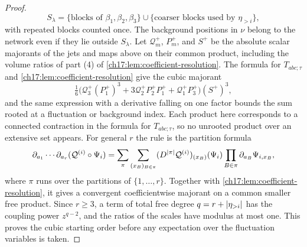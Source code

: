 \begin{proof}
\[
 S_\lambda=\{\text{blocks of }\beta_1,\beta_2,\beta_3\}\cup\{\text{coarser blocks used by }\eta_{>i}\},
\]
with repeated blocks counted once. The background positions in $\nu$ belong to the network even if they lie outside $S_\lambda$. Let $\mathcal Q_m^+$, $P_m^+$, and $S^+$ be the absolute scalar majorants of the jets and maps above on their common product, including the volume ratios of part (4) of \cref{ch17:lem:coefficient-resolution}. The formula for $T_{abc;\tau}$ and \cref{ch17:lem:coefficient-resolution} give the cubic majorant
\[
 \tfrac16\bigl(\mathcal Q_3^+(P_1^+)^3+3\mathcal Q_2^+P_2^+P_1^++\mathcal Q_1^+P_3^+\bigr)(S^+)^3,
\]
and the same expression with a derivative falling on one factor bounds the sum rooted at a fluctuation or background index. Each product here corresponds to a connected contraction in the formula for $T_{abc;\tau}$, so no unrooted product over an extensive set appears. For general $r$ the rule is the partition formula
\[
 \partial_{a_1}\cdots\partial_{a_r}(\mathcal Q^{(i)}\circ\Psi_i)=\sum_{\pi}\sum_{(x_B)_{B\in\pi}}(D^{\lvert \pi\rvert}\mathcal Q^{(i)})_{(x_B)}(\Psi_i)\prod_{B\in\pi}\partial_{a_B}\Psi_{i,x_B},
\]
where $\pi$ runs over the partitions of $\{1,\ldots,r\}$. Together with \cref{ch17:lem:coefficient-resolution}, it gives a convergent coefficientwise majorant on a common smaller free product. Since $r\ge3$, a term of total free degree $q=r+\lvert \eta_{>i}\rvert$ has the coupling power $z^{q-2}$, and the ratios of the scales have modulus at most one. This proves the cubic starting order before any expectation over the fluctuation variables is taken.


\end{proof}
